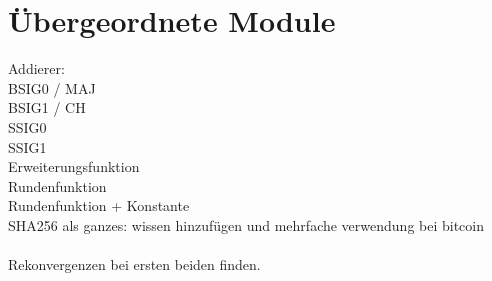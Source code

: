 \section{Übergeordnete Module}


Addierer:\\
BSIG0 / MAJ\\
BSIG1 / CH\\
SSIG0\\
SSIG1\\
Erweiterungsfunktion\\
Rundenfunktion\\
Rundenfunktion + Konstante\\
SHA256 als ganzes: wissen hinzufügen und mehrfache verwendung bei bitcoin\\
~\\
Rekonvergenzen bei ersten beiden finden.
